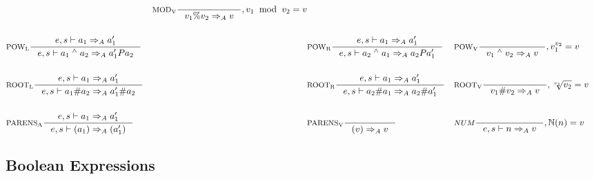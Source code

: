 \begin{align*}
&
&\inference[$\text{MOD}_\text{V}$]{}
                    {v_1 \% v_2 \Rightarrow_A v}
										{, v_1 \;\; \textrm{mod} \;\; v_2 = v}
\\\\
&\inference[$\text{POW}_\text{L}$]{e,s \vdash a_1  \Rightarrow_A a_1'}
                    {e,s \vdash a_1 \; ^\wedge{} \; a_2 \Rightarrow_A a_1' P a_2}
&
&\inference[$\text{POW}_\text{R}$]{e,s \vdash a_1 \Rightarrow_A a_1'}
                    {e,s \vdash a_2 \; ^\wedge{} \; a_1 \Rightarrow_A a_2 P a_1'}
&
&\inference[$\text{POW}_\text{V}$]{}
                    {v_1 \; ^\wedge{} \; v_2 \Rightarrow_A v}
										{, v_1 ^ {v_2} = v}
\\\\
&\inference[$\text{ROOT}_\text{L}$]{e,s \vdash a_1 \Rightarrow_A a_1'}
                    {e,s \vdash a_1 \# a_2 \Rightarrow_A a_1' \# a_2}
&
&\inference[$\text{ROOT}_\text{R}$]{e,s \vdash a_1 \Rightarrow_A a_1'}
                    {e,s \vdash a_2 \# a_1 \Rightarrow_A a_2 \# a_1'}
&
&\inference[$\text{ROOT}_\text{V}$]{}
                    {v_1 \# v_2 \Rightarrow_A v}
										{, \sqrt[v_1]{v_2} = v}
\\\\
&\inference[$\text{PARENS}_\text{A}$]{e,s \vdash a_1 \Rightarrow_A a_1'}
                       {e,s \vdash (a_1) \Rightarrow_A (a_1')}
&
&\inference[$\text{PARENS}_\text{V}$]{}
                       {(v) \Rightarrow_A v}
&
&\inference[$NUM$]{}
                  {e,s \vdash n \Rightarrow_A v}
									{, \mathbb{N}(n) = v}
\end{align*}

\subsection{Boolean Expressions}
\newcommand{\Tand}{\mathbin{\text{AND}}}
\newcommand{\Tnot}{\mathbin{\text{NOT}}}
\newcommand{\Tnand}{\mathbin{\text{NAND}}}
\newcommand{\Tor}{\mathbin{\text{OR}}}
\newcommand{\Tnor}{\mathbin{\text{NOR}}}
\newcommand{\Txor}{\mathbin{\text{XOR}}}

